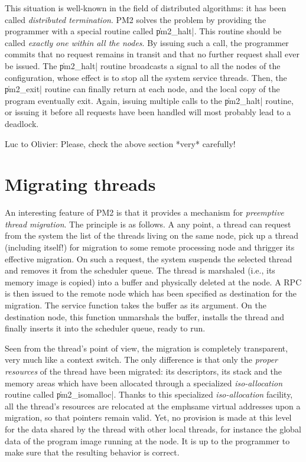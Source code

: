This situation is well-known in the field of distributed algorithms:
it has been called \emph{distributed termination}. PM2 solves the
problem by providing the programmer with a special routine called
\|pm2_halt|.  This routine should be called \emph{exactly one within
  all the nodes}. By issuing such a call, the programmer commits that
no request remains in transit and that no further request shall ever
be issued. The \|pm2_halt| routine broadcasts a signal to all the
nodes of the configuration, whose effect is to stop all the system
service threads. Then, the \|pm2_exit| routine can finally return at each
node, and the local copy of the program eventually exit. Again,
issuing multiple calls to the \|pm2_halt| routine, or issuing it
before all requests have been handled will most probably lead to a
deadlock.

\begin{note}
  Luc to Olivier: Please, check the above section *very* carefully!
\end{note}

\section{Migrating threads}

An interesting feature of PM2 is that it provides a mechanism for
\emph{preemptive thread migration}. The principle is as follows. A any
point, a thread can request from the system the list of the threads
living on the same node, pick up a thread (including itself!)  for
migration to some remote processing node and thrigger its effective
migration.  On such a request, the system suspends the selected thread
and removes it from the scheduler queue. The thread is marshaled
(i.e., its memory image is copied) into a buffer and physically
deleted at the node. A RPC is then issued to the remote node which has
been specified as destination for the migration. The service function
takes the buffer as its argument. On the destination node, this
function unmarshals the buffer, installs the thread and finally
inserts it into the scheduler queue, ready to run.

Seen from the thread's point of view, the migration is completely
transparent, very much like a context switch. The only difference is
that only the \emph{proper resources} of the thread have been
migrated: its descriptors, its stack and the memory areas which have
been allocated through a specialized \emph{iso-allocation} routine
called \|pm2_isomalloc|.  Thanks to this specialized
\emph{iso-allocation} facility, all the thread's resources are
relocated at the emph{same virtual addresses} upon a migration, so
that pointers remain valid.  Yet, no provision is made at this level
for the data shared by the thread with other local threads, for
instance the global data of the program image running at the node. It
is up to the programmer to make sure that the resulting behavior is
correct.

